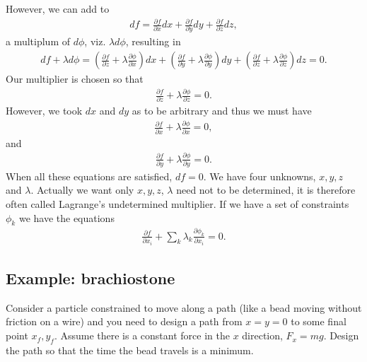\documentclass[letterpaper,10pt,english]{sphinxmanual}
\begin{document}
However, we can add to
\begin{equation*}
\begin{split}
df = \frac{\partial f}{\partial x}dx+\frac{\partial f}{\partial y}dy+\frac{\partial f}{\partial z}dz,
\end{split}
\end{equation*}
a multiplum of \(d\phi\), viz. \(\lambda d\phi\), resulting  in
\begin{equation*}
\begin{split}
df+\lambda d\phi = (\frac{\partial f}{\partial z}+\lambda\frac{\partial \phi}{\partial x})dx+(\frac{\partial f}{\partial y}+\lambda\frac{\partial \phi}{\partial y})dy+(\frac{\partial f}{\partial z}+\lambda\frac{\partial \phi}{\partial z})dz =0.
\end{split}
\end{equation*}
Our multiplier is chosen so that
\begin{equation*}
\begin{split}
\frac{\partial f}{\partial z}+\lambda\frac{\partial \phi}{\partial z} =0.
\end{split}
\end{equation*}
However, we took \(dx\) and \(dy\) as to be arbitrary and thus we must have
\begin{equation*}
\begin{split}
\frac{\partial f}{\partial x}+\lambda\frac{\partial \phi}{\partial x} =0,
\end{split}
\end{equation*}
and
\begin{equation*}
\begin{split}
\frac{\partial f}{\partial y}+\lambda\frac{\partial \phi}{\partial y} =0.
\end{split}
\end{equation*}
When all these equations are satisfied, \(df=0\).  We have four
unknowns, \(x,y,z\) and \(\lambda\). Actually we want only \(x,y,z\),
\(\lambda\) need not to be determined, it is therefore often called
Lagrange’s undetermined multiplier.  If we have a set of constraints
\(\phi_k\) we have the equations
\begin{equation*}
\begin{split}
\frac{\partial f}{\partial x_i}+\sum_k\lambda_k\frac{\partial \phi_k}{\partial x_i} =0.
\end{split}
\end{equation*}

\subsection{Example: brachiostone}
\label{\detokenize{chapter1:example-brachiostone}}
Consider a particle constrained to move along a path (like a bead
moving without friction on a wire) and you need to design a path from
\(x=y=0\) to some final point \(x_f,y_f\). Assume there is a constant
force in the \(x\) direction, \(F_x=mg\). Design the path so that the time
the bead travels is a minimum.
\end{document}
